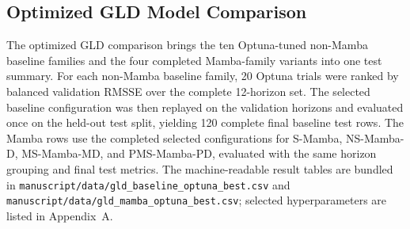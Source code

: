 \subsection{Optimized GLD Model Comparison}

The optimized GLD comparison brings the ten Optuna-tuned non-Mamba baseline families and the four completed Mamba-family variants into one test summary.
For each non-Mamba baseline family, 20 Optuna trials were ranked by balanced validation RMSSE over the complete 12-horizon set.
The selected baseline configuration was then replayed on the validation horizons and evaluated once on the held-out test split, yielding 120 complete final baseline test rows.
The Mamba rows use the completed selected configurations for S-Mamba, NS-Mamba-D, MS-Mamba-MD, and PMS-Mamba-PD, evaluated with the same horizon grouping and final test metrics.
The machine-readable result tables are bundled in \texttt{manuscript/data/gld\_baseline\_optuna\_best.csv} and \texttt{manuscript/data/gld\_mamba\_optuna\_best.csv}; selected hyperparameters are listed in Appendix~A.

\begin{table}[H]
\centering
\caption{Combined optimized GLD model summary grouped by forecast range. Short = 1--7 days, middle = 14--90 days, long = 120--360 days. Lower RMSSE is better.}
\label{tab:gld-term-avg}
\small
{}
\end{table}

